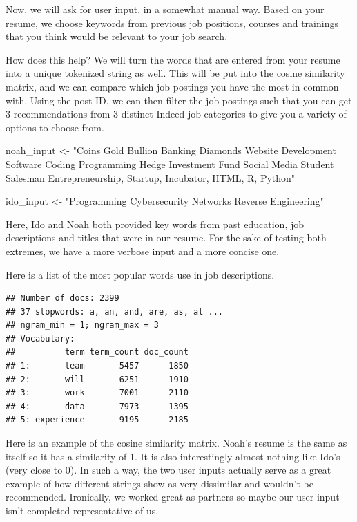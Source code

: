 \documentclass[
]{article}
\newenvironment{Shaded}{\begin{snugshade}}{\end{snugshade}}
\newcommand{\NormalTok}[1]{#1}
\newcommand{\OtherTok}[1]{\textcolor[rgb]{0.56,0.35,0.01}{#1}}
\newcommand{\StringTok}[1]{\textcolor[rgb]{0.31,0.60,0.02}{#1}}
\begin{document}
Now, we will ask for user input, in a somewhat manual way. Based on your
resume, we choose keywords from previous job positions, courses and
trainings that you think would be relevant to your job search.

How does this help? We will turn the words that are entered from your
resume into a unique tokenized string as well. This will be put into the
cosine similarity matrix, and we can compare which job postings you have
the most in common with. Using the post ID, we can then filter the job
postings such that you can get 3 recommendations from 3 distinct Indeed
job categories to give you a variety of options to choose from.

\begin{Shaded}
\begin{Highlighting}[]
\NormalTok{noah\_input }\OtherTok{\textless{}{-}} \StringTok{"Coins Gold Bullion Banking Diamonds Website Development Software Coding Programming Hedge Investment Fund Social Media Student Salesman Entrepreneurship, Startup, Incubator, HTML, R, Python"}

\NormalTok{ido\_input }\OtherTok{\textless{}{-}}  \StringTok{"Programming Cybersecurity Networks Reverse Engineering"}
\end{Highlighting}
\end{Shaded}

Here, Ido and Noah both provided key words from past education, job
descriptions and titles that were in our resume. For the sake of testing
both extremes, we have a more verbose input and a more concise one.

Here is a list of the most popular words use in job descriptions.

\begin{verbatim}
## Number of docs: 2399 
## 37 stopwords: a, an, and, are, as, at ... 
## ngram_min = 1; ngram_max = 3 
## Vocabulary: 
##          term term_count doc_count
## 1:       team       5457      1850
## 2:       will       6251      1910
## 3:       work       7001      2110
## 4:       data       7973      1395
## 5: experience       9195      2185
\end{verbatim}

Here is an example of the cosine similarity matrix. Noah's resume is the
same as itself so it has a similarity of 1. It is also interestingly
almost nothing like Ido's (very close to 0). In such a way, the two user
inputs actually serve as a great example of how different strings show
as very dissimilar and wouldn't be recommended. Ironically, we worked
great as partners so maybe our user input isn't completed representative
of us.
\end{document}
